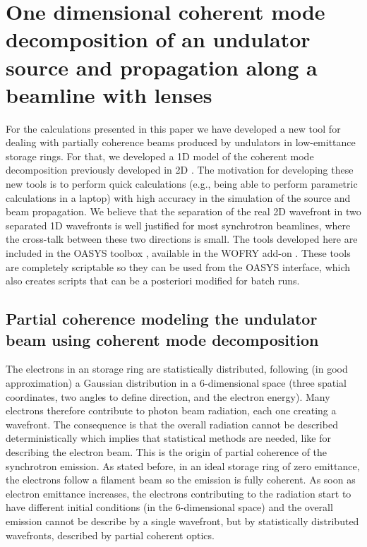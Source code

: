 \documentclass{iucr}              %
\begin{document}



\section{One dimensional coherent mode decomposition of an undulator source and propagation along a beamline with lenses}

For the calculations presented in this paper we have developed a new tool for dealing with partially coherence beams produced by undulators in low-emittance storage rings. For that, we developed a 1D model of the coherent mode decomposition previously developed in 2D \cite{XX}. The motivation for developing these new tools is to perform quick calculations (e.g., being able to perform parametric calculations in a laptop) with high accuracy in the simulation of the source and beam propagation. We believe that the separation of the real 2D wavefront in two separated 1D wavefronts is well justified for most synchrotron beamlines, where the cross-talk between these two directions is small. 
The tools developed here are included in the OASYS toolbox \cite{XX}, available in the WOFRY add-on \cite{XX}. These tools are completely scriptable so they can be used from the OASYS interface, which also creates scripts that can be a posteriori modified for batch runs. 



\subsection{Partial coherence modeling the undulator beam using coherent mode decomposition}

The electrons in an storage ring are statistically distributed, following (in good approximation) a Gaussian distribution in a 6-dimensional space (three spatial coordinates, two angles to define direction, and the electron energy). Many electrons therefore contribute to photon beam radiation, each one creating a wavefront. The consequence is that the overall radiation cannot be described deterministically which implies that statistical methods are needed, like for describing the electron beam. This is the origin of partial coherence of the synchrotron emission. As stated before, in an ideal storage ring of zero emittance, the electrons follow a filament beam so the emission is fully coherent. As soon as  electron emittance increases, the electrons contributing to the radiation start to have different initial conditions (in the 6-dimensional space) and the overall emission cannot be describe by a single wavefront, but by statistically distributed wavefronts, described by partial coherent optics.
\end{document}
